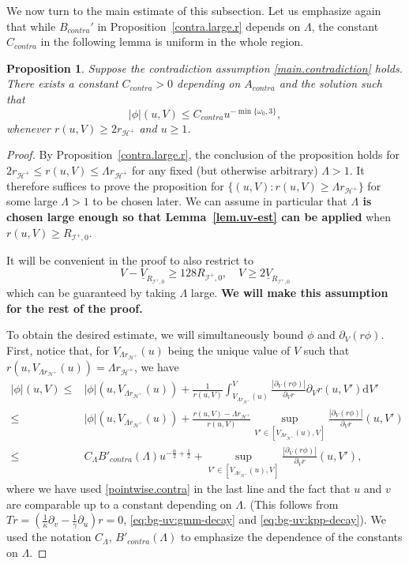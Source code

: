\documentclass[10pt, reqno]{amsart}
\newtheorem{proposition}[theorem]{Proposition}
\theoremstyle{definition}
\theoremstyle{remark}
\theoremstyle{conjecture}
\numberwithin{equation}{section}
\newcommand{\ud}{\mathrm{d}}
\newcommand{\rd}{\partial}
\newcommand{\0}{\emptyset}
\newcommand{\alp}{\alpha}
\newcommand{\omg}{\omega}
\newcommand{\calH}{\mathcal H}
\newcommand{\calI}{\mathcal I}
\newcommand{\f}{\frac}
\newcommand{\EH}{\calH^{+}}
\newcommand{\NI}{\calI^{+}}						%
\newcommand{\Vb}{\underline{V}}
\begin{document}
We now turn to the main estimate of this subsection. Let us emphasize again that while $B_{contra}'$ in Proposition~\ref{contra.large.r} depends on $\Lambda$, the constant $C_{contra}$ in the following lemma is uniform in the whole region.
\begin{proposition}\label{prop.contra.unif}
Suppose the contradiction assumption \eqref{main.contradiction} holds.
There exists a constant $C_{contra}>0$ depending on $A_{contra}$ and the solution such that 
$$|\phi|(u,V)\leq C_{contra} u^{-\min\{\omg_0,3\}},$$
whenever $r(u,V)\geq 2 r_{\EH}$ and $u\geq 1$.
\end{proposition}
\begin{proof}
By Proposition~\ref{contra.large.r}, the conclusion of the proposition holds for $2 r_{\EH}\leq r(u,V)\leq \Lambda r_{\EH}$ for any fixed (but otherwise arbitrary) $\Lambda>1$. It therefore suffices to prove the proposition for $\{(u,V):r(u,V)\geq \Lambda r_{\EH}\}$ for some large $\Lambda>1$ to be chosen later. We can assume in particular that \textbf{$\Lambda$ is chosen large enough so that Lemma~\ref{lem.uv-est} can be applied} when $r(u,V)\geq R_{\NI,0}$.

It will be convenient in the proof to also restrict to 
\begin{equation}\label{contra.unif.large.V}
V - \Vb_{R_{\NI,0}}\geq 128 R_{\NI,0}, \quad V \geq 2 \Vb_{R_{\NI,0}}
\end{equation}
which can be guaranteed by taking $\Lambda$ large. \textbf{We will make this assumption for the rest of the proof.}

To obtain the desired estimate, we will simultaneously bound $\phi$ and $\rd_V(r\phi)$. First, notice that, for $V_{\Lambda r_{\EH}}(u)$ being the unique value of $V$ such that $r(u,V_{\Lambda r_{\EH}}(u))=\Lambda r_{\EH}$, we have
\begin{equation}\label{contra.unif.phi.est}
\begin{split}
|\phi|(u,V)\leq &|\phi|(u, V_{\Lambda r_{\EH}}(u))+\f{1}{r(u,V)}\int_{V_{\Lambda r_{\EH}}(u)}^V \f{|\rd_V(r\phi)|}{\rd_V r}\rd_V r (u,V') \ud V'\\
\leq &|\phi|(u, V_{\Lambda r_{\EH}}(u))+\f{r(u,V)-\Lambda r_{\EH}}{r(u,V)} \sup_{V'\in [V_{\Lambda r_{\EH}}(u),V]}\f{|\rd_V(r\phi)|}{\rd_V r}(u,V')\\
\leq & C_{\Lambda} B'_{contra}(\Lambda) u^{-\f{\alp}{2}+\f 12}+\sup_{V'\in [V_{\Lambda r_{\EH}}(u),V]}\f{|\rd_V(r\phi)|}{\rd_V r}(u,V'),
\end{split}
\end{equation}
where we have used \eqref{pointwise.contra} in the last line and the fact that $u$ and $v$ are comparable up to a constant depending on $\Lambda$. (This follows from $Tr=\left(\f{1}{\kappa}\rd_v-\f{1}{\gamma}\rd_u\right)r=0$, \eqref{eq:bg-uv:gmm-decay} and \eqref{eq:bg-uv:kpp-decay}). We used the notation $C_\Lambda$, $B'_{contra}(\Lambda)$ to emphasize the dependence of the constants on $\Lambda$. 


\end{proof}
\end{document}
